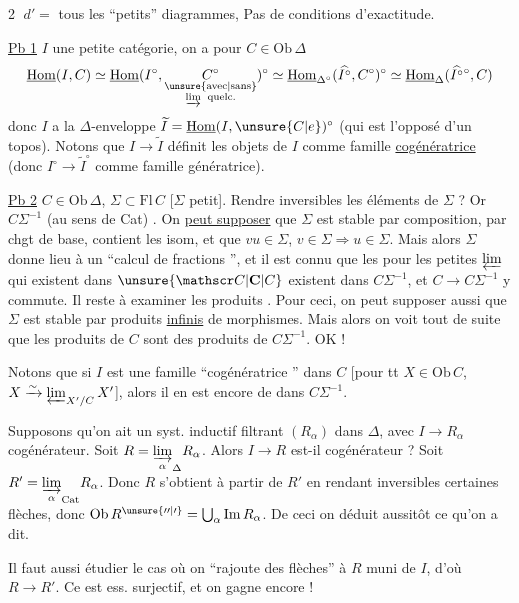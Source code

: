 \textcircled{2} $d'=$ tous les ``petits'' diagrammes,  Pas de conditions d'exactitude.

\uline{Pb 1} $I$ une petite catégorie, on a pour $C\in\mathrm{Ob}\,\Delta$
\[
\underline{\mathrm{Hom}}(I,C)\simeq\underline{\mathrm{Hom}}(I^\circ,
\underset{\substack{\text{\unsure{avec|sans}}\\\varinjlim\ \text{quelc.}}}{C^\circ})^{\circ}
\simeq\underline{\mathrm{Hom}}_{\Delta^\circ}(\widehat{I^\circ},C^\circ)^\circ
\simeq\underline{\mathrm{Hom}}_{\Delta}(\widehat{I^\circ}{}^\circ,C)
\]
donc $I$ a la $\Delta$-enveloppe $\widetilde I=\underline{\mathrm{Hom}}(I,\unsure{C|e})^\circ$ (qui est l'opposé d'un topos). Notons que $I\longrightarrow\widetilde I$ définit les objets de $I$ comme famille \uline{cogénératrice} (donc $I^\circ\longrightarrow\widetilde I^\circ$ comme famille génératrice).

\uline{Pb 2} $C\in\mathrm{Ob}\,\Delta$, $\Sigma\subset\mathrm{Fl}\,C$ [$\Sigma$ petit]. Rendre inversibles les éléments de $\Sigma$ ?  Or $C\Sigma^{-1}$ (au sens de Cat) . On \uline{peut supposer} que $\Sigma$ est stable par composition, par chgt de base, contient les isom, et  que $vu\in\Sigma$, $v\in\Sigma\Longrightarrow u\in\Sigma$. Mais alors $\Sigma$ donne lieu à un ``calcul de fractions '', et il est connu que  les  pour les petites $\varprojlim$ qui existent dans $\unsure{\mathscr C|\mathbf C|C}$ existent dans $C\Sigma^{-1}$, et $C\longrightarrow C\Sigma^{-1}$ y commute.
Il reste à examiner les produits . Pour ceci, on peut supposer aussi que $\Sigma$ est stable par produits \uline{infinis} de morphismes. Mais alors on voit tout de suite que les produits de $C$ sont des produits de $C\Sigma^{-1}$. OK !

Notons que si $I$ est une famille ``cogénératrice '' dans  $C$ [pour tt $X\in\mathrm{Ob}\,C$, $X\xrightarrow{\sim}\varprojlim_{X^{\prime}/C}X'$], alors il en est encore de  dans $C\Sigma^{-1}$. 

Supposons qu'on ait un  syst. inductif filtrant $(R_\alpha)$ dans $\Delta$, avec $I\longrightarrow R_\alpha$ cogénérateur. Soit $R=\underset{\alpha}{\varinjlim}_{\Delta}R_\alpha$. Alors $I\longrightarrow R$ est-il cogénérateur ? Soit $R'=\underset{\alpha}{\varinjlim}_{\mathrm{Cat}}R_\alpha$.  Donc $R$ s'obtient à partir de $R'$ en rendant inversibles certaines flèches, donc $\mathrm{Ob}\,R^{\unsure{\prime\prime|\prime}}=\bigcup_{\alpha}\mathrm{Im}\,R_\alpha$. De ceci on déduit aussitôt ce qu'on a dit.

Il faut aussi étudier le cas où on ``rajoute des flèches'' à $R$ muni de $I$, d'où $R\longrightarrow R'$. Ce   est ess. surjectif, et on gagne encore !
